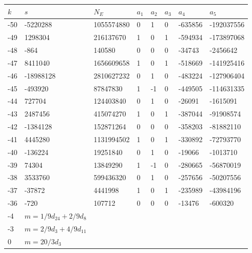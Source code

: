 \documentclass{amsart}
\begin{document}
\begin{longtable}{|l|l|l|lllll|}
\hline
$k$ & $s$ & $N_E$ & $a_1$ & $a_2$ & $a_3$ & $a_4$ & $a_5$\\
\hline
-50&-5220288&1055574880&0&1&0&-635856&-192037556\\
-49&1298304&216137670&1&0&1&-594934&-173897068\\
-48&-864&140580&0&0&0&-34743&-2456642\\
-47&8411040&1656609658&1&0&1&-518669&-141925416\\
-46&-18988128&2810627232&0&1&0&-483224&-127906404\\
-45&-493920&87847830&1&-1&0&-449505&-114631335\\
-44&727704&124403840&0&1&0&-26091&-1615091\\
-43&2487456&415074270&1&0&1&-387044&-91908574\\
-42&-1384128&152871264&0&0&0&-358203&-81882110\\
-41&4445280&1131994502&1&0&1&-330892&-72793770\\
-40&-136224&19251840&0&1&0&-19066&-1013710\\
-39&74304&13849290&1&-1&0&-280665&-56870019\\
-38&3533760&599436320&0&1&0&-257656&-50207556\\
-37&-37872&4441998&1&0&1&-235989&-43984196\\
-36&-720&107712&0&0&0&-13476&-600320\\
-4&$m=1/9d_{24}+2/9d_{8}$&&\multicolumn{5}{c|}{}\\
-3&$m=2/9d_{3}+4/9d_{11}$&&\multicolumn{5}{c|}{}\\
0&$m=20/3d_{3}$&&\multicolumn{5}{c|}{}\\
\hline
\end{longtable}
\end{document}
